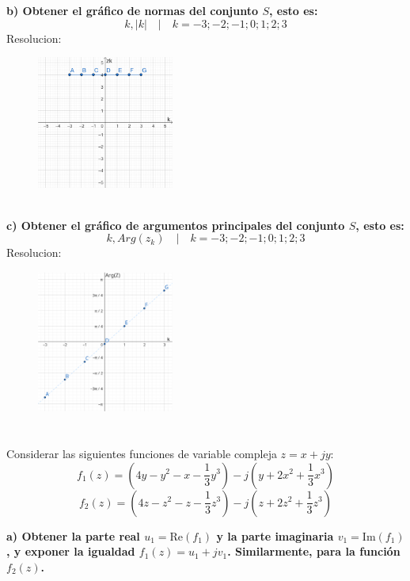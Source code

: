 \documentclass[12pt,a4paper]{report}
\begin{document}
\vspace{10cm}
\textbf{b) Obtener el gráfico de normas del conjunto $S$, esto es:}
    $$k, |k| \quad | \quad k = -3;-2;-1;0;1;2;3 $$
Resolucion:\\
\begin{figure}[h] %
    \centering %
    \includegraphics[width=0.4\textwidth]{./Imagenes/foto1Ej1.png} %
\end{figure}\\
\textbf{c) Obtener el gráfico de argumentos principales del conjunto $S$, esto es:}
    $$k, Arg(z_k) \quad | \quad k = -3;-2;-1;0;1;2;3 $$
Resolucion:\\
\begin{figure}[h] %
    \centering %
    \includegraphics[width=0.4\textwidth]{./Imagenes/foto2Ej1.png} %
\end{figure}
\chapter{}%
Considerar las siguientes funciones de variable compleja $z = x + jy$:
$$f_1(z) = (4y - y^2 - x - \frac{1}{3}y^3) - j(y + 2x^2 + \frac{1}{3}x^3)$$
$$f_2(z) = (4z - z^2 - z - \frac{1}{3}z^3) - j(z + 2z^2 + \frac{1}{3}z^3)$$

\textbf{a) Obtener la parte real $u_1 = \text{Re}(f_1)$ y la parte imaginaria $v_1 = \text{Im}(f_1)$
, y exponer la igualdad $f_1(z) = u_1 + jv_1$. Similarmente, para la función $f_2(z)$.}\\
\end{document}
